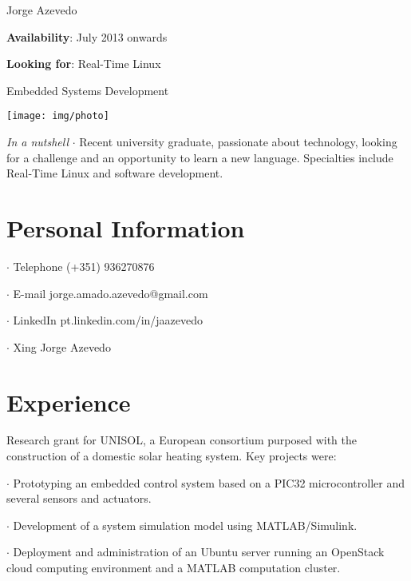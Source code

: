 



\topSection
{
	{\Huge Jorge Azevedo}

	\vspace{1.5mm}
	\vspace*{10mm}

	\textbf{Availability}: July 2013 onwards

	\textbf{Looking for}: Real-Time Linux

	\hspace{66pt}Embedded Systems Development
} {
	\texttt{[image: img/photo]}
}

\emph{In a nutshell} $\cdot$  Recent university graduate, passionate about
technology, looking for a challenge and an opportunity to learn a new language.
Specialties include Real-Time Linux and software development.

\section*{Personal Information}

{
 $\cdot$  Telephone (+351) 936270876

 $\cdot$  E-mail jorge.amado.azevedo@gmail.com

 $\cdot$  LinkedIn pt.linkedin.com/in/jaazevedo

 $\cdot$  Xing Jorge Azevedo
}

\section*{Experience}

{
Research grant for UNISOL, a European consortium purposed with the construction
of a domestic solar heating system. Key projects were:

 $\cdot$  Prototyping an embedded control system based on a PIC32 microcontroller and
several sensors and actuators.

 $\cdot$  Development of a system simulation model using MATLAB/Simulink.

 $\cdot$  Deployment and administration of an Ubuntu server running an
OpenStack cloud computing environment and a MATLAB computation cluster.
}

